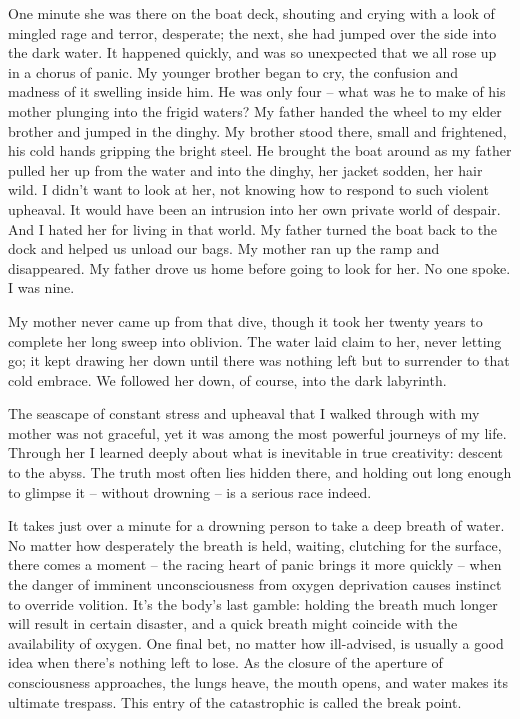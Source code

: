 \documentclass[letterpaper,10pt,headsepline]{scrreprt}
\begin{document}
\vspace{1em}
\noindent
One minute she was there on the boat deck, shouting and crying with a look of mingled rage and terror, desperate; the next, she had jumped over the side into the dark water. It happened quickly, and was so unexpected that we all rose up in a chorus of panic. My younger brother began to cry, the confusion and madness of it swelling inside him. He was only four – what was he to make of his mother plunging into the frigid waters? My father handed the wheel to my elder brother and jumped in the dinghy. My brother stood there, small and frightened, his cold hands gripping the bright steel. He brought the boat around as my father pulled her up from the water and into the dinghy, her jacket sodden, her hair wild. I ­didn’t want to look at her, not knowing how to respond to such violent upheaval. It would have been an intrusion into her own private world of despair. And I hated her for living in that world. My father turned the boat back to the dock and helped us unload our bags. My mother ran up the ramp and disappeared. My father drove us home before going to look for her. No one spoke. I was nine.

My mother never came up from that dive, though it took her twenty years to complete her long sweep into oblivion. The water laid claim to her, never letting go; it kept drawing her down until there was nothing left but to surrender to that cold embrace. We followed her down, of course, into the dark labyrinth.

The seascape of constant stress and upheaval that I walked through with my mother was not graceful, yet it was among the most powerful journeys of my life. Through her I learned deeply about what is inevitable in true creativity: descent to the abyss. The truth most often lies hidden there, and holding out long enough to glimpse it – without drowning – is a serious race indeed.

It takes just over a minute for a drowning person to take a deep breath of water. No matter how desperately the breath is held, waiting, clutching for the surface, there comes a moment – the racing heart of panic brings it more quickly – when the danger of imminent unconsciousness from oxygen deprivation causes instinct to override volition. It’s the body’s last gamble: holding the breath much longer will result in certain disaster, and a quick breath might coincide with the availability of oxygen. One final bet, no matter how ill-­advised, is usually a good idea when there’s nothing left to lose. As the closure of the aperture of consciousness approaches, the lungs heave, the mouth opens, and water makes its ultimate trespass. This entry of the catastrophic is called the break point.
\end{document}
